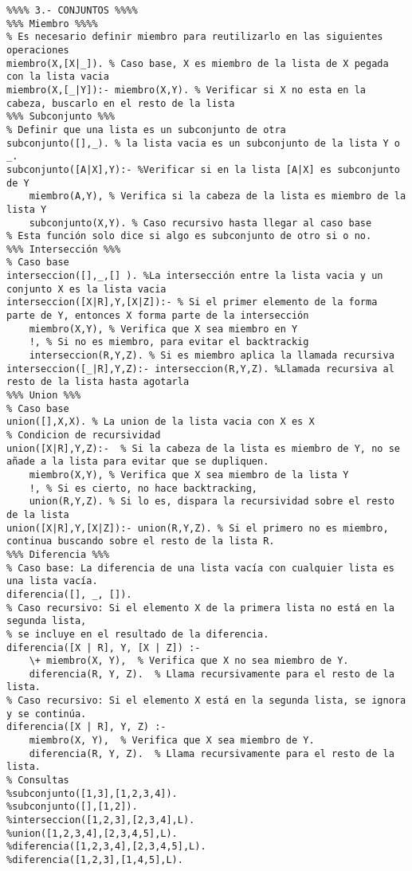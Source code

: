 \documentclass[11pt, letterpaper]{article}
\begin{document}
\begin{lstlisting}
%%%% 3.- CONJUNTOS %%%%
%%% Miembro %%%%
% Es necesario definir miembro para reutilizarlo en las siguientes operaciones
miembro(X,[X|_]). % Caso base, X es miembro de la lista de X pegada con la lista vacia
miembro(X,[_|Y]):- miembro(X,Y). % Verificar si X no esta en la cabeza, buscarlo en el resto de la lista
%%% Subconjunto %%%
% Definir que una lista es un subconjunto de otra
subconjunto([],_). % la lista vacia es un subconjunto de la lista Y o _.
subconjunto([A|X],Y):- %Verificar si en la lista [A|X] es subconjunto de Y
    miembro(A,Y), % Verifica si la cabeza de la lista es miembro de la lista Y
    subconjunto(X,Y). % Caso recursivo hasta llegar al caso base
% Esta función solo dice si algo es subconjunto de otro si o no.
%%% Intersección %%%
% Caso base
interseccion([],_,[] ). %La intersección entre la lista vacia y un conjunto X es la lista vacia
interseccion([X|R],Y,[X|Z]):- % Si el primer elemento de la forma parte de Y, entonces X forma parte de la intersección
    miembro(X,Y), % Verifica que X sea miembro en Y
    !, % Si no es miembro, para evitar el backtrackig
    interseccion(R,Y,Z). % Si es miembro aplica la llamada recursiva
interseccion([_|R],Y,Z):- interseccion(R,Y,Z). %Llamada recursiva al resto de la lista hasta agotarla
%%% Union %%% 
% Caso base
union([],X,X). % La union de la lista vacia con X es X
% Condicion de recursividad
union([X|R],Y,Z):-  % Si la cabeza de la lista es miembro de Y, no se añade a la lista para evitar que se dupliquen.
    miembro(X,Y), % Verifica que X sea miembro de la lista Y
    !, % Si es cierto, no hace backtracking,
    union(R,Y,Z). % Si lo es, dispara la recursividad sobre el resto de la lista
union([X|R],Y,[X|Z]):- union(R,Y,Z). % Si el primero no es miembro, continua buscando sobre el resto de la lista R.
%%% Diferencia %%%
% Caso base: La diferencia de una lista vacía con cualquier lista es una lista vacía.
diferencia([], _, []). 
% Caso recursivo: Si el elemento X de la primera lista no está en la segunda lista,
% se incluye en el resultado de la diferencia.
diferencia([X | R], Y, [X | Z]) :-
    \+ miembro(X, Y),  % Verifica que X no sea miembro de Y.
    diferencia(R, Y, Z).  % Llama recursivamente para el resto de la lista.
% Caso recursivo: Si el elemento X está en la segunda lista, se ignora y se continúa.
diferencia([X | R], Y, Z) :-
    miembro(X, Y),  % Verifica que X sea miembro de Y.
    diferencia(R, Y, Z).  % Llama recursivamente para el resto de la lista.
% Consultas
%subconjunto([1,3],[1,2,3,4]).
%subconjunto([],[1,2]).
%interseccion([1,2,3],[2,3,4],L).
%union([1,2,3,4],[2,3,4,5],L).
%diferencia([1,2,3,4],[2,3,4,5],L).
%diferencia([1,2,3],[1,4,5],L).
\end{lstlisting}
\end{document}
